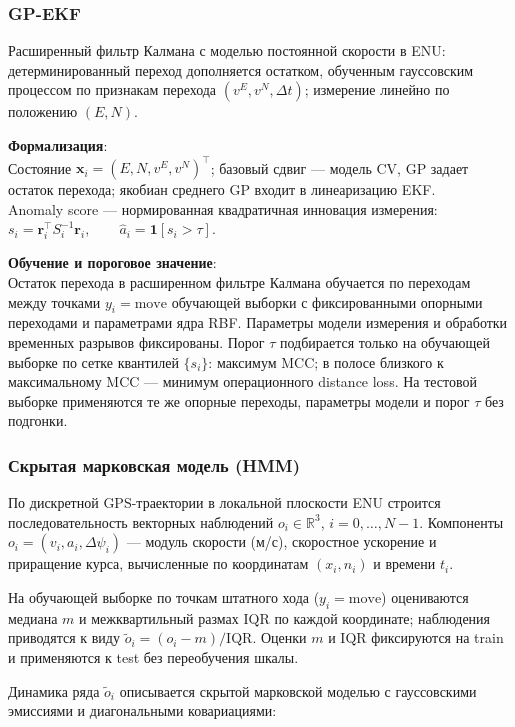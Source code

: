 \documentclass[a4paper,12pt]{report}
\begin{document}
	\subsubsection{GP-EKF}
	Расширенный фильтр Калмана с моделью постоянной скорости в ENU: детерминированный переход дополняется остатком, обученным гауссовским процессом по признакам перехода $(v^E, v^N, \Delta t)$; измерение линейно по положению $(E,N)$.

	\textbf{Формализация}:\\
	Состояние $\mathbf{x}_i=(E,N,v^E,v^N)^\top$; базовый сдвиг — модель CV, GP задает остаток перехода; якобиан среднего GP входит в линеаризацию EKF. \\
	Anomaly score — нормированная квадратичная инновация измерения: $s_i=\mathbf{r}_i^\top S_i^{-1}\mathbf{r}_i, \qquad \hat a_i=\mathbf{1}[s_i>\tau].$

	\textbf{Обучение и пороговое значение}:\\
	Остаток перехода в расширенном фильтре Калмана обучается по переходам между точками $y_i=\mathrm{move}$ обучающей выборки с фиксированными опорными переходами и параметрами ядра RBF. Параметры модели измерения и обработки временных разрывов фиксированы. Порог $\tau$ подбирается только на обучающей выборке по сетке квантилей $\{s_i\}$: максимум MCC; в полосе близкого к максимальному MCC — минимум операционного distance loss. На тестовой выборке применяются те же опорные переходы, параметры модели и порог $\tau$ без подгонки.

	\subsubsection{Скрытая марковская модель (HMM)}
	По дискретной GPS-траектории в локальной плоскости ENU строится последовательность векторных наблюдений $o_i\in\mathbb{R}^3$, $i=0,\ldots,N-1$. Компоненты $o_i=(v_i,a_i,\Delta\psi_i)$ — модуль скорости (м/с), скоростное ускорение и приращение курса, вычисленные по координатам $(x_i,n_i)$ и времени $t_i$.

	На обучающей выборке по точкам штатного хода ($y_i=\mathrm{move}$) оцениваются медиана $m$ и межквартильный размах $\mathrm{IQR}$ по каждой координате; наблюдения приводятся к виду $\tilde o_i=(o_i-m)/\mathrm{IQR}$. Оценки $m$ и $\mathrm{IQR}$ фиксируются на train и применяются к test без переобучения шкалы.

	Динамика ряда $\tilde o_i$ описывается скрытой марковской моделью с гауссовскими эмиссиями и диагональными ковариациями:
\end{document}
